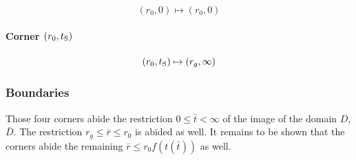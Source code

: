 \[
    (r_0, 0) \mapsto (r_0, 0)
\]

\paragraph{Corner $(r_0, t_\mathrm S)$}

\[
    (r_0, t_\mathrm S) \mapsto (r_g, \infty)
\]

\subsubsection*{Boundaries}

Those four corners abide the restriction $0 \leq \bar t < \infty$ of the image
of the domain $D$, $\bar D$. The restriction $r_g \leq \bar r \leq r_0$ is
abided as well. It remains to be shown that the corners abide the remaining
$\bar r \leq r_0 f(t(\bar t))$ as well.


\IfFileExists{\bibliographyfile}{
    \printbibliography
}{}



